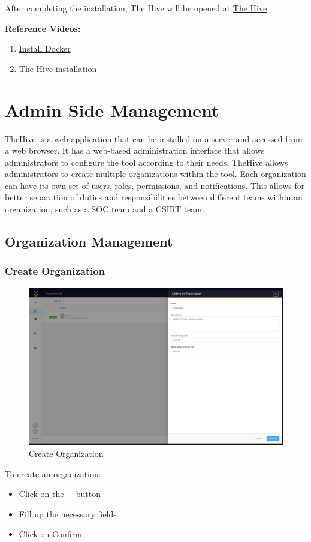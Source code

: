 \documentclass{book}
\begin{document}
After completing the installation, The Hive will be opened at \href{http://localhost:9000/}{The Hive}.

\bigskip
\bigskip
\bigskip
\bigskip

\textbf{Reference Videos:}
\begin{enumerate}
    \item \href{https://www.youtube.com/watch?v=ILdziITdSag&ab_channel=InfrontofIT}{Install Docker}
    \item \href{https://www.youtube.com/watch?v=Vr4flc55S5c&pp=ygUaaW5zdGFsbCB0aGUgaGl2ZSBpbiB1YnVudHU%3D}{The Hive installation}
\end{enumerate}



\chapter{Admin Side Management}
TheHive is a web application that can be installed on a server and accessed from a web browser. It has a web-based administration interface that allows administrators to configure the tool according to their needs.
\newline
TheHive allows administrators to create multiple organizations within the tool. Each organization can have its own set of users, roles, permissions, and notifications. This allows for better separation of duties and responsibilities between different teams within an organization, such as a SOC team and a CSIRT team.
\newline

\section{Organization Management}
\subsection{Create Organization}
\begin{figure}[h]
    \centering
    \includegraphics[width=0.7\linewidth]{Organization_images/add_org.png}
    \caption{Create Organization}
    \label{fig:createorg}
\end{figure}
To create an organization: 
\begin{itemize}
    \item Click on the + button
    \item Fill up the necessary fields
    \item Click on Confirm
\end{itemize}
\end{document}
